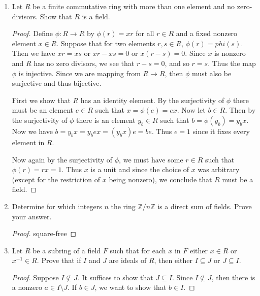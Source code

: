 \documentclass{article}
\theoremstyle{definition}
\begin{document}
\begin{enumerate}
            \item Let $R$ be a finite commutative ring with more than one element and no zero-divisors. Show that $R$ is a field.
            
            \begin{proof}
                Define $\phi:R\to R$ by $\phi(r)=xr$ for all $r\in R$ and a fixed nonzero element $x\in R$. Suppose that for two elements $r,s\in R$, $\phi(r)=phi(s)$. Then we have $xr=xs$ or $xr-xs=0$ or $x(r-s)=0$. Since $x$ is nonzero and $R$ has no zero divisors, we see that $r-s=0$, and so $r=s$. Thus the map $\phi$ is injective. Since we are mapping from $R\to R$, then $\phi$ must also be surjective and thus bijective. 
                
                First we show that $R$ has an identity element. By the surjectivity of $\phi$ there must be an element $e\in R$ such that $x=\phi(e)=ex$. Now let $b\in R$. Then by the surjectivity of $\phi$ there is an element $y_b\in R$ such that $b=\phi(y_b)=y_bx$. Now we have $b=y_bx=y_bex=(y_bx)e=be$. Thus $e=1$ since it fixes every element in $R$. 

                Now again by the surjectivity of $\phi$, we must have some $r\in R$ such that $\phi(r)=rx=1$. Thus $x$ is a unit and since the choice of $x$ was arbitrary (except for the restriction of $x$ being nonzero), we conclude that $R$ must be a field.
            \end{proof}

            \item Determine for which integers $n$ the ring $\mathbb{Z}/n\mathbb{Z}$ is a direct sum of fields. Prove your answer.
            
            \begin{proof}
                square-free
            \end{proof}

            \item Let $R$ be a subring of a field $F$ such that for each $x$ in $F$ either $x\in R$ or $x^{-1}\in R$. Prove that if $I$ and $J$ are ideals of $R$, then either $I\subseteq J$ or $J\subseteq I$.
            
            \begin{proof}
                Suppose $I\nsubseteq J$. It suffices to show that $J\subseteq I$. Since $I \nsubseteq J$, then there is a nonzero $a\in I\setminus J$. If $b\in J$, we want to show that $b\in I$. 


\end{proof}
\end{enumerate}
\end{document}
